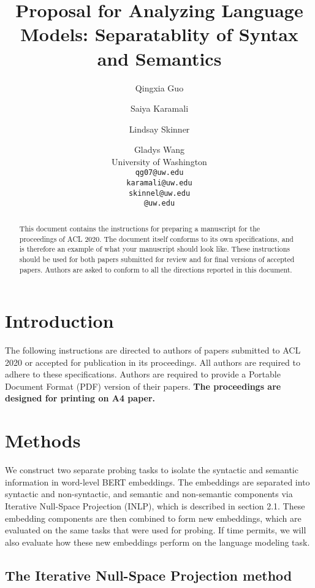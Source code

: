 \documentclass[11pt,a4paper]{article}
\title{Proposal for Analyzing Language Models: Separatablity of Syntax and Semantics}
\author{Qingxia Guo \and Saiya Karamali \and Lindsay Skinner \and Gladys Wang
 \\ University of Washington \\ 
\texttt{qg07@uw.edu}\\ \texttt{karamali@uw.edu}  \\ \texttt{skinnel@uw.edu} \\ \texttt{@uw.edu}}
\date{}
\begin{document}
\maketitle
\begin{abstract}
This document contains the instructions for preparing a manuscript for the proceedings of ACL 2020.
The document itself conforms to its own specifications, and is therefore an example of what your manuscript should look like.
These instructions should be used for both papers submitted for review and for final versions of accepted papers.
Authors are asked to conform to all the directions reported in this document.
\end{abstract}




\section{Introduction}

The following instructions are directed to authors of papers submitted to ACL 2020 or accepted for publication in its proceedings.
All authors are required to adhere to these specifications.
Authors are required to provide a Portable Document Format (PDF) version of their papers.
\textbf{The proceedings are designed for printing on A4 paper.}


\section{Methods}

We construct two separate probing tasks to isolate the syntactic and semantic information in word-level BERT embeddings. The embeddings are separated into syntactic and non-syntactic, and semantic and non-semantic components via Iterative Null-Space Projection (INLP), which is described in section 2.1. These embedding components are then combined to form new embeddings, which are evaluated on the same tasks that were used for probing. If time permits, we will also evaluate how these new embeddings perform on the language modeling task. 

\subsection{The Iterative Null-Space Projection method}
\end{document}
